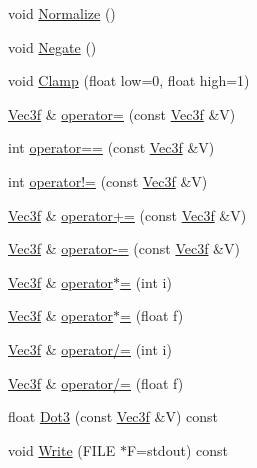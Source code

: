 \begin{DoxyCompactItemize}
\item 
void \hyperlink{classVec3f_af0a81998f92a3ec791f88e26dcba04b6}{Normalize} ()
\item 
void \hyperlink{classVec3f_a52caf47ad4ce4e87ea8711372f686fcc}{Negate} ()
\item 
void \hyperlink{classVec3f_a6fde73a1fa95ab67c4ba418779ca1a93}{Clamp} (float low=0, float high=1)
\item 
\hyperlink{classVec3f}{Vec3f} \& \hyperlink{classVec3f_a87fd52c3a87f128e40ef26184f63631e}{operator=} (const \hyperlink{classVec3f}{Vec3f} \&V)
\item 
int \hyperlink{classVec3f_a11cf71014645816cbb04a26cf6e05db5}{operator==} (const \hyperlink{classVec3f}{Vec3f} \&V)
\item 
int \hyperlink{classVec3f_a12bfa6655b9b6b903fc826f3a5a99556}{operator!=} (const \hyperlink{classVec3f}{Vec3f} \&V)
\item 
\hyperlink{classVec3f}{Vec3f} \& \hyperlink{classVec3f_a012e12e4f4d4185f5850717351e73ebd}{operator+=} (const \hyperlink{classVec3f}{Vec3f} \&V)
\item 
\hyperlink{classVec3f}{Vec3f} \& \hyperlink{classVec3f_a052981b67b5c4c54b410246873818297}{operator-\/=} (const \hyperlink{classVec3f}{Vec3f} \&V)
\item 
\hyperlink{classVec3f}{Vec3f} \& \hyperlink{classVec3f_a8ac720d387f1ab4d3577179f6435133c}{operator$\ast$=} (int i)
\item 
\hyperlink{classVec3f}{Vec3f} \& \hyperlink{classVec3f_a5647d3c70a29b578010f60bc5cf76cee}{operator$\ast$=} (float f)
\item 
\hyperlink{classVec3f}{Vec3f} \& \hyperlink{classVec3f_a5a59d4069dd5d6f353ff5fe75a021e2f}{operator/=} (int i)
\item 
\hyperlink{classVec3f}{Vec3f} \& \hyperlink{classVec3f_a47c059393f04ca83ae89a0170df03827}{operator/=} (float f)
\item 
float \hyperlink{classVec3f_ad42ff4d372bf88c8ce3e3a73d83f5911}{Dot3} (const \hyperlink{classVec3f}{Vec3f} \&V) const 
\item 
void \hyperlink{classVec3f_a245fa514b086b4d9826d41ff4b9e3304}{Write} (F\+I\+L\+E $\ast$F=stdout) const 
\end{DoxyCompactItemize}
